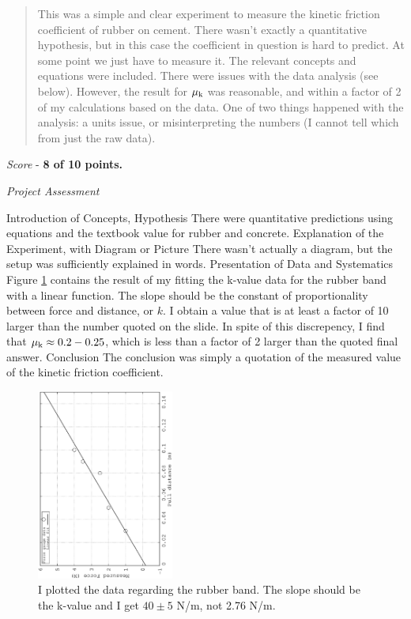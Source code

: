 \documentclass[10pt]{article}
\begin{document}
\maketitle

\begin{abstract}
This was a simple and clear experiment to measure the kinetic friction coefficient of rubber on cement.  There wasn't exactly a quantitative hypothesis, but in this case the coefficient in question is hard to predict.  At some point we just have to measure it.  The relevant concepts and equations were included.  There were issues with the data analysis (see below).  However, the result for $\mu_{\rm k}$ was reasonable, and within a factor of 2 of my calculations based on the data.  One of two things happened with the analysis: a units issue, or misinterpreting the numbers (I cannot tell which from just the raw data).
\end{abstract}

\textit{Score} - \textbf{8 of 10 points.}

\textit{Project Assessment}
\begin{outline}[enumerate]
\1 Introduction of Concepts, Hypothesis
\2 There were quantitative predictions using equations and the textbook value for rubber and concrete.
\1 Explanation of the Experiment, with Diagram or Picture
\2 There wasn't actually a diagram, but the setup was sufficiently explained in words.
\1 Presentation of Data and Systematics
\2 Figure \ref{fig:f1} contains the result of my fitting the k-value data for the rubber band with a linear function.  The slope should be the constant of proportionality between force and distance, or $k$.  I obtain a value that is at least a factor of 10 larger than the number quoted on the slide.  In spite of this discrepency, I find that $\mu_{\rm k} \approx 0.2-0.25$, which is less than a factor of 2 larger than the quoted final answer.
\1 Conclusion
\2 The conclusion was simply a quotation of the measured value of the kinetic friction coefficient.
\end{outline}
\begin{figure}[hb]
\centering
\includegraphics[width=0.4\textwidth,angle=270]{Dec7_plot1.eps}
\caption{\label{fig:f1} I plotted the data regarding the rubber band.  The slope should be the k-value and I get $40\pm5$ N/m, not 2.76 N/m.}
\end{figure}
\end{document}
